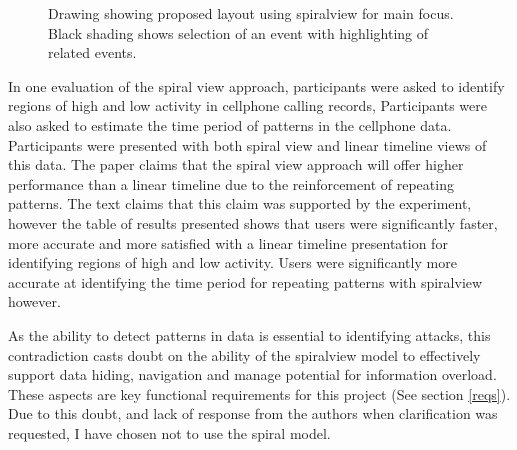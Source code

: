 \begin{figure}[tbh]
\caption{\protect\label{spiral_plan}Drawing showing proposed layout using spiralview for main focus. Black shading shows selection of an event with highlighting of related events.}
\end{figure}
 
In one evaluation of the spiral view approach, participants were asked to identify regions of high and low activity in cellphone calling records, Participants were also asked to estimate the time period of patterns in the cellphone data. Participants were presented with both spiral view and linear timeline views of this data. The paper \cite{chin2009visual} claims that the spiral view approach will offer higher performance than a linear timeline due to the reinforcement of repeating patterns. The text claims that this claim was supported by the experiment, however the table of results presented shows that users were significantly faster, more accurate and more satisfied with a linear timeline presentation for identifying regions of high and low activity. Users were significantly more accurate at identifying the time period for repeating patterns with spiralview however.  

As the ability to detect patterns in data is essential to identifying attacks, this contradiction casts doubt on the ability of the spiralview model to effectively support data hiding, navigation and manage potential for information overload. These aspects are key functional requirements for this project (See section \ref{reqs}). Due to this doubt, and lack of response from the authors when clarification was requested, I have chosen not to use the spiral model. 

